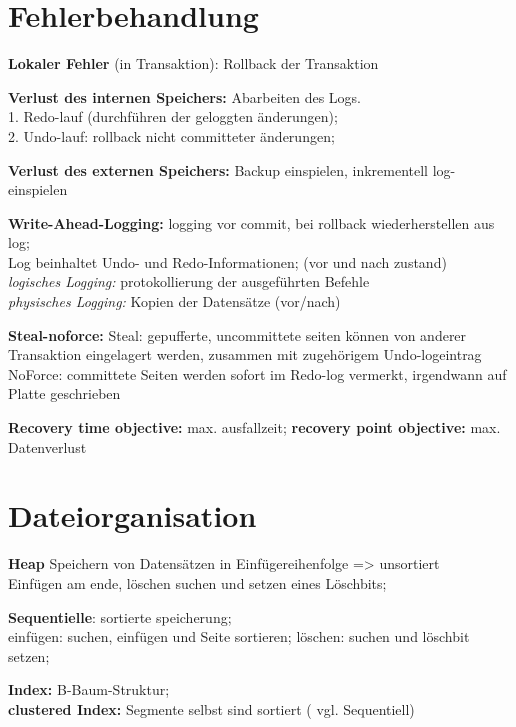 \section{Fehlerbehandlung}
\textbf{Lokaler Fehler} (in Transaktion): Rollback der Transaktion

\textbf{Verlust des internen Speichers:} Abarbeiten des Logs.\\
1. Redo-lauf (durchführen der geloggten änderungen); \\
2. Undo-lauf: rollback nicht committeter änderungen;

\textbf{Verlust des externen Speichers:} Backup einspielen, inkrementell log-einspielen


\textbf{Write-Ahead-Logging:} logging vor commit, bei rollback wiederherstellen aus log;\\
Log beinhaltet Undo- und Redo-Informationen; (vor und nach zustand)\\
\textit{logisches Logging:} protokollierung der ausgeführten Befehle\\
\textit{physisches Logging:} Kopien der Datensätze (vor/nach)

\textbf{Steal-noforce:}
Steal: gepufferte, uncommittete seiten können von anderer Transaktion eingelagert werden, zusammen mit zugehörigem Undo-logeintrag\\
NoForce: committete Seiten werden sofort im Redo-log vermerkt, irgendwann auf Platte geschrieben



\textbf{Recovery time objective:} max. ausfallzeit; \textbf{recovery point objective:} max. Datenverlust

\section{Dateiorganisation}
\textbf{Heap} Speichern von Datensätzen in Einfügereihenfolge => unsortiert\\
Einfügen am ende, löschen suchen und setzen eines Löschbits;

\textbf{Sequentielle}: sortierte speicherung;\\
einfügen: suchen, einfügen und Seite sortieren; löschen: suchen und löschbit setzen;

\textbf{Index:} B-Baum-Struktur; \\ 
\textbf{clustered Index:} Segmente selbst sind sortiert ( vgl. Sequentiell)  


